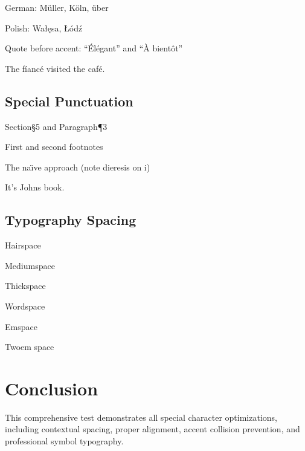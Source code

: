 \documentclass[11pt]{article}
\begin{document}
German: Müller, Köln, über

Polish: Wałęsa, Łódź

Quote before accent: ``Élégant'' and ``À bientôt''

The f\'iancé visited the caf\'e.

\subsection{Special Punctuation}

Section\S 5 and Paragraph\P 3

First\dag{} and second\ddag{} footnotes

The na\"\i ve approach (note dieresis on i)

It's John\apos{}s book.

\subsection{Typography Spacing}

Hair\thinspace space

Medium\medspace space

Thick\thickspace space

Word\wordspace space

Em\emspace space

Two\twoemspace em space

\section{Conclusion}

This comprehensive test demonstrates all special character optimizations, including contextual spacing, proper alignment, accent collision prevention, and professional symbol typography.
\end{document}
